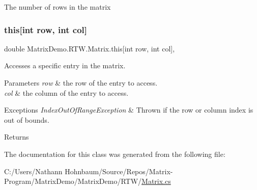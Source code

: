 The number of rows in the matrix 

\mbox{\label{class_matrix_demo_1_1_r_t_w_1_1_matrix_aa908f44fc8fd669347ba6a4833406f66}} 
\subsubsection{\texorpdfstring{this[int row, int col]}{this[int row, int col]}}
{\footnotesize\ttfamily double Matrix\+Demo.\+R\+T\+W.\+Matrix.\+this\mbox{[}int row, int col\mbox{]}\hspace{0.3cm}{\ttfamily [get]}, {\ttfamily [set]}}



Accesses a specific entry in the matrix. 


\begin{DoxyParams}{Parameters}
{\em row} & the row of the entry to access.\\
\hline
{\em col} & the column of the entry to access.\\
\hline
\end{DoxyParams}

\begin{DoxyExceptions}{Exceptions}
{\em Index\+Out\+Of\+Range\+Exception} & Thrown if the row or column index is out of bounds.\\
\hline
\end{DoxyExceptions}
\begin{DoxyReturn}{Returns}

\end{DoxyReturn}


The documentation for this class was generated from the following file\+:\begin{DoxyCompactItemize}
\item 
C\+:/\+Users/\+Nathann Hohnbaum/\+Source/\+Repos/\+Matrix-\/\+Program/\+Matrix\+Demo/\+Matrix\+Demo/\+R\+T\+W/\mbox{\hyperlink{_matrix_8cs}{Matrix.\+cs}}\end{DoxyCompactItemize}
